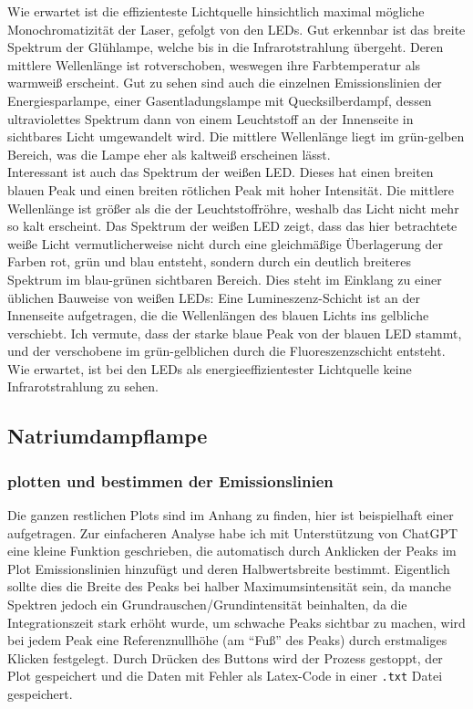 Wie erwartet ist die effizienteste Lichtquelle hinsichtlich maximal mögliche Monochromatizität der Laser, gefolgt von den LEDs. Gut erkennbar ist das breite Spektrum der Glühlampe, welche bis in die Infrarotstrahlung übergeht. Deren mittlere Wellenlänge ist rotverschoben, weswegen ihre Farbtemperatur als warmweiß erscheint.
Gut zu sehen sind auch die einzelnen Emissionslinien der Energiesparlampe, einer Gasentladungslampe mit Quecksilberdampf, dessen ultraviolettes Spektrum dann von einem Leuchtstoff an der Innenseite in sichtbares Licht umgewandelt wird. 
Die mittlere Wellenlänge liegt im grün-gelben Bereich, was die Lampe eher als
kaltweiß erscheinen lässt. \\
Interessant ist auch das Spektrum der weißen LED. Dieses hat
einen breiten blauen Peak und einen breiten rötlichen Peak mit hoher Intensität.  Die mittlere Wellenlänge ist größer als die der Leuchtstoffröhre, weshalb das Licht nicht mehr so kalt erscheint.
Das Spektrum der weißen LED zeigt, dass das hier betrachtete weiße Licht vermutlicherweise nicht durch eine gleichmäßige Überlagerung der Farben rot, grün und blau
entsteht, sondern durch ein deutlich breiteres Spektrum im blau-grünen sichtbaren Bereich.
Dies steht im Einklang zu einer üblichen Bauweise von weißen LEDs: Eine Lumineszenz-Schicht ist an der Innenseite aufgetragen, die die Wellenlängen des blauen Lichts ins gelbliche verschiebt. Ich vermute, dass der starke blaue Peak von der blauen LED stammt, und der verschobene im grün-gelblichen durch die Fluoreszenzschicht entsteht.
Wie erwartet, ist bei den LEDs als energieeffizientester Lichtquelle keine Infrarotstrahlung zu sehen.

\subsection{Natriumdampflampe}
\subsubsection{plotten und bestimmen der Emissionslinien}

Die ganzen restlichen Plots sind im Anhang zu finden, hier ist beispielhaft einer aufgetragen. Zur einfacheren Analyse habe ich mit Unterstützung von ChatGPT eine kleine Funktion geschrieben, die automatisch durch Anklicken der Peaks im Plot Emissionslinien hinzufügt und deren Halbwertsbreite bestimmt. 
Eigentlich sollte dies die Breite des Peaks bei halber Maximumsintensität sein, da manche Spektren jedoch ein Grundrauschen/Grundintensität beinhalten, da die Integrationszeit stark erhöht wurde, um schwache Peaks sichtbar zu machen, wird bei jedem Peak eine Referenznullhöhe (am \enquote{Fuß} des Peaks) durch erstmaliges Klicken festgelegt. 
Durch Drücken des Buttons wird der Prozess gestoppt, der Plot gespeichert und die Daten mit Fehler als Latex-Code in einer \verb|.txt| Datei gespeichert.

